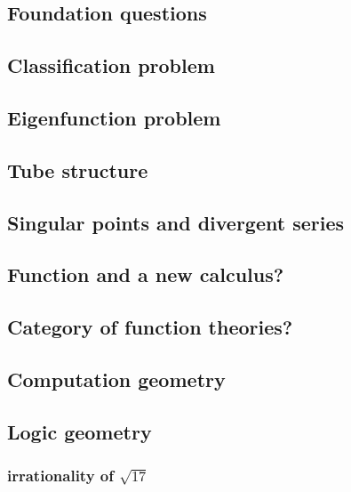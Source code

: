 
\subsection{Foundation questions}\label{sec:foundation}

\subsection{Classification problem}\label{sec:donaghey}

\subsection{Eigenfunction problem}\label{sec:eigenfunction}

\subsection{Tube structure}\label{sec:tube}

\subsection{Singular points and divergent series}\label{sec:singularity}

\subsection{Function and a new calculus?}\label{sec:caculus}

\subsection{Category of function theories?}\label{sec:function}

\subsection{Computation geometry}\label{sec:computation}

\subsection{Logic geometry}\label{sec:logic}

\subsubsection{irrationality of $\sqrt{17}$}
